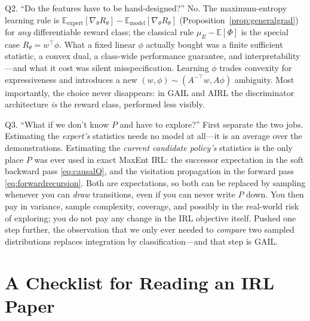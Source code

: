 \documentclass[11pt]{article}
\theoremstyle{plain}
\theoremstyle{definition}
\theoremstyle{remark}
\newcommand{\E}{\mathbb{E}}
\begin{document}
\begin{graybox}{Q2. ``Do the features have to be hand-designed?''}
No. The maximum-entropy learning rule is $\E_{\text{expert}}[\nabla_\theta
R_\theta] - \E_{\text{model}}[\nabla_\theta R_\theta]$
(Proposition~\ref{prop:generalgrad}) for \emph{any} differentiable reward
class; the classical rule $\mu_E - \E[\Phi]$ is the special case
$R_\theta=w^\top\phi$. What a fixed linear $\phi$ actually bought was a
finite sufficient statistic, a convex dual, a class-wide performance
guarantee, and interpretability---and what it cost was silent
misspecification. Learning $\phi$ trades convexity for expressiveness and
introduces a new $(w,\phi)\sim(A^{-\top}w,A\phi)$ ambiguity. Most
importantly, the choice never disappears: in GAIL and AIRL the
discriminator architecture \emph{is} the reward class, performed less
visibly.
\end{graybox}

\begin{graybox}{Q3. ``What if we don't know $P$ and have to explore?''}
First separate the two jobs. Estimating the \emph{expert's} statistics
needs no model at all---it is an average over the demonstrations.
Estimating the \emph{current candidate policy's} statistics is the only
place $P$ was ever used in exact MaxEnt IRL: the successor expectation in
the soft backward pass \eqref{eq:causalQ}, and the visitation propagation
in the forward pass \eqref{eq:forwardrecursion}. Both are expectations, so
both can be replaced by sampling whenever you can \emph{draw} transitions,
even if you can never write $P$ down. You then pay in variance, sample
complexity, coverage, and possibly in the real-world risk of exploring;
you do not pay any change in the IRL objective itself. Pushed one step
further, the observation that we only ever needed to \emph{compare} two
sampled distributions replaces integration by classification---and that
step is GAIL.
\end{graybox}

\section{A Checklist for Reading an IRL Paper}
\end{document}
